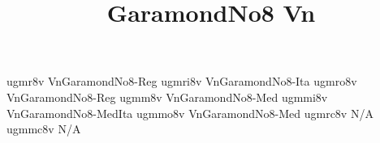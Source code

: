 \documentclass[test]{vnsample}
\title{GaramondNo8 Vn}
\begin{document}
\begin{shortsample}
  {ugmr8v}   {VnGaramondNo8-Reg}
 {ugmri8v}  {VnGaramondNo8-Ita}
 {ugmro8v}  {VnGaramondNo8-Reg}
  {ugmm8v}   {VnGaramondNo8-Med}
 {ugmmi8v}  {VnGaramondNo8-MedIta}
 {ugmmo8v}  {VnGaramondNo8-Med}
 {ugmrc8v}  {N/A}
 {ugmmc8v}  {N/A}
\end{shortsample}
\end{document}
